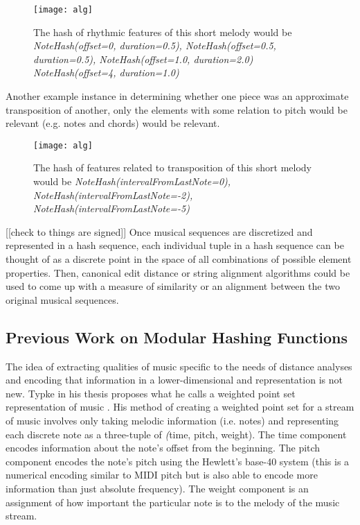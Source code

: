 \begin{figure}[H]
\centering
\texttt{[image: alg]}
\caption{The hash of rhythmic features of this short melody would be \textit{NoteHash(offset=0, duration=0.5), NoteHash(offset=0.5, duration=0.5), NoteHash(offset=1.0, duration=2.0) NoteHash(offset=4, duration=1.0)}}
\end{figure}

Another example instance in determining whether one piece was an approximate transposition of another, only the elements with some relation to pitch would be relevant (e.g. notes and chords) would be relevant. 

\begin{figure}[H]
\centering
\texttt{[image: alg]}
\caption{The hash of features related to transposition of this short melody would be \textit{NoteHash(intervalFromLastNote=0), NoteHash(intervalFromLastNote=-2), NoteHash(intervalFromLastNote=-5)}}
\end{figure}
[[check to things are signed]]
Once musical sequences are discretized and represented in a hash sequence, each individual tuple in a hash sequence can be thought of as a discrete point in the space of all combinations of possible element properties. Then, canonical edit distance or string alignment algorithms could be used to come up with a measure of similarity or an alignment between the two original musical sequences.

\subsection{Previous Work on Modular Hashing Functions}
The idea of extracting qualities of music specific to the needs of distance analyses and encoding that information in a lower-dimensional and representation is not new. Typke in his thesis proposes what he calls a weighted point set representation of music \cite{typke}. His method of creating a weighted point set for a stream of music involves only taking melodic information (i.e. notes) and representing each discrete note as a three-tuple of \textit(time, pitch, weight). The time component encodes information about the note's offset from the beginning. The pitch component encodes the note's pitch using the Hewlett's base-40 system \cite{hewlett}(this is a numerical encoding similar to MIDI pitch but is also able to encode more information than just absolute frequency). The weight component is an assignment of how important the particular note is to the melody of the music stream. 

